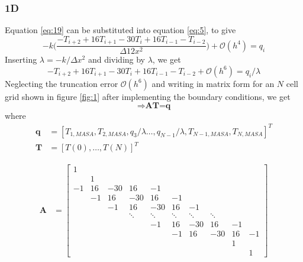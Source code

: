 \documentclass[12pt]{amsart}   %
\begin{document}
\subsubsection{1D} Equation \ref{eq:19} can be substituted into equation \ref{eq:5}, to give
\begin{equation}
-k \Bigg(\frac{-T_{i+2}+16T_{i+1} -30T_{i} + 16T_{i-1} - T_{i-2}}{\Delta 12x^2} \Bigg)+\mathcal{O}(h^4) = q_i
\end{equation}
Inserting $\lambda = -k/\Delta x^2$ and dividing by $\lambda$, we get
\begin{equation}
{-T_{i+2}+16T_{i+1} -30T_{i} + 16T_{i-1} - T_{i-2}} +\mathcal{O}(h^6) = q_i/\lambda
\end{equation}
Neglecting the truncation error $\mathcal{O}(h^6)$ and writing in matrix form for an $N$ cell grid shown in figure \ref{fig:1} after implementing the boundary conditions, we get
\begin{equation}
\Rightarrow \textbf{AT=q}
\end{equation}
where 
                \begin{align*}
                    \mathbf{q} &= \left[T_{1,MASA} ,T_{2, MASA},q_{3}/\lambda \hdots,q_{N-1}/\lambda, T_{N-1,MASA},T_{N,MASA}\right]^T\\
                    \mathbf{T} &= [T(0) ,\hdots, T(N)]^T
                \end{align*}
                
                
                \begin{align*}
                    \mathbf{A} &= \begin{bmatrix} 
                    1\\
                    & 1 &   \\
                    -1 & 16 & -30 & 16 & -1  \\
                    &-1 & 16 & -30 & 16 & -1  \\
                    &&-1 & 16 & -30 & 16 & -1  \\
                    &&& \ddots&\ddots&\ddots&\ddots&\ddots\\
                    &&&& -1 & 16 & -30 & 16 & -1 \\
                    &&&&& -1 & 16 & -30 & 16 & -1\\
                    &&&&&&& & 1 &\\
                    &&&&&&&&& 1
                    \end{bmatrix}
                \end{align*}
\end{document}
